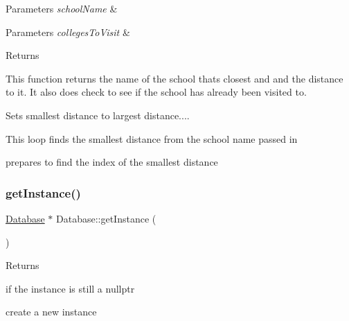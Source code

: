 \begin{DoxyItemize}
\item 
\begin{DoxyParams}{Parameters}
{\em school\+Name} & \\
\hline
\end{DoxyParams}

\item 
\begin{DoxyParams}{Parameters}
{\em colleges\+To\+Visit} & \\
\hline
\end{DoxyParams}

\item \begin{DoxyReturn}{Returns}

\end{DoxyReturn}
This function returns the name of the school thats closest and and the distance to it. It also does check to see if the school has already been visited to. 
\end{DoxyItemize}Sets smallest distance to largest distance....

This loop finds the smallest distance from the school name passed in

prepares to find the index of the smallest distance \mbox{\label{class_database_a5a3b028f980a577ea0b809eb92312761}} 
\subsubsection{\texorpdfstring{get\+Instance()}{getInstance()}}
{\footnotesize\ttfamily \hyperlink{class_database}{Database} $\ast$ Database\+::get\+Instance (\begin{DoxyParamCaption}{ }\end{DoxyParamCaption})\hspace{0.3cm}{\ttfamily [static]}}


\begin{DoxyItemize}
\item \begin{DoxyReturn}{Returns}

\end{DoxyReturn}

\end{DoxyItemize}if the instance is still a nullptr

create a new instance

